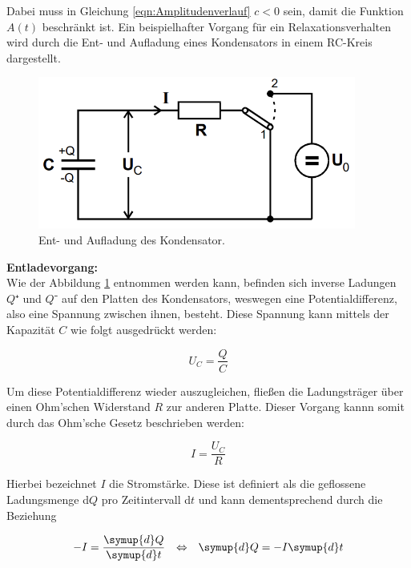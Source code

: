 \noindent Dabei muss in Gleichung \eqref{eqn:Amplitudenverlauf} $c < 0$ sein, damit die Funktion $A(t)$ beschränkt ist.
Ein beispielhafter Vorgang für ein Relaxationsverhalten wird durch die Ent- und Aufladung eines Kondensators in einem 
RC-Kreis dargestellt.

\begin{figure}[H]
    \centering
    \includegraphics[height=5cm]{./content/v353_Schaltkreise_1.png}
    \caption{Ent- und Aufladung des Kondensator.}
    \label{fig:Ladungsvorgang}
\end{figure}

\noindent \textbf{Entladevorgang:}\\
\noindent Wie der Abbildung \ref{fig:Ladungsvorgang} entnommen werden kann, befinden sich inverse Ladungen $Q⁺$ und $Q⁻$ auf den Platten 
des Kondensators, weswegen eine Potentialdifferenz, also eine Spannung zwischen ihnen, besteht. Diese Spannung kann mittels 
der Kapazität $C$ wie folgt ausgedrückt werden:

\begin{equation}
    U_C = \frac{Q}{C}
    \label{eqn:Spannung}
\end{equation}

\noindent Um diese Potentialdifferenz wieder auszugleichen, fließen die Ladungsträger über einen Ohm'schen Widerstand $R$ zur anderen Platte.
Dieser Vorgang kannn somit durch das Ohm'sche Gesetz beschrieben werden:

\begin{equation}
    I = \frac{U_C}{R}
    \label{eqn:Ohm}
\end{equation}

\noindent Hierbei bezeichnet $I$ die Stromstärke. Diese ist definiert als die geflossene Ladungsmenge d$Q$ pro Zeitintervall d$t$ und kann dementsprechend
durch die Beziehung

\begin{align}
    -I &= \frac{\symup{d}Q}{\symup{d}t} &\Leftrightarrow& &\symup{d}Q = -I\symup{d}t 
    \label{eqn:Stromstaerke}
\end{align}

